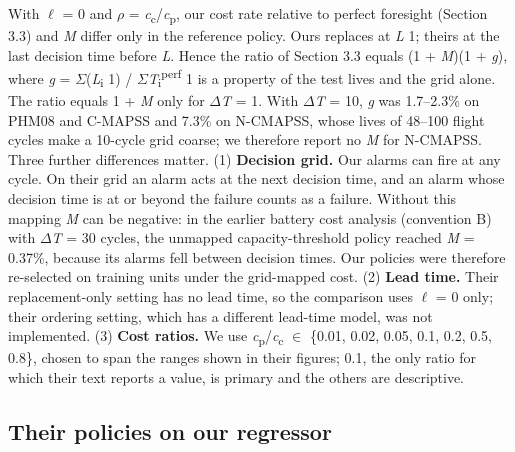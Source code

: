 \documentclass[a4paper,fleqn,doubleblind]{cas-dc}
\begin{document}
With $\ell$ = 0 and $\rho$ = \textit{c}\textsubscript{c}/\textit{c}\textsubscript{p}, our cost rate relative to perfect foresight (Section 3.3) and \textit{M} differ only in the reference policy. Ours replaces at \textit{L} \textminus{} 1; theirs at the last decision time before \textit{L}. Hence the ratio of Section 3.3 equals (1 + \textit{M})(1 + \textit{g}), where \textit{g} = $\Sigma$(\textit{L}\textsubscript{i} \textminus{} 1) / $\Sigma$\textit{T}\textsubscript{i}\textsuperscript{perf} \textminus{} 1 is a property of the test lives and the grid alone. The ratio equals 1 + \textit{M} only for $\Delta$\textit{T} = 1. With $\Delta$\textit{T} = 10, \textit{g} was 1.7--2.3\% on PHM08 and C-MAPSS and 7.3\% on N-CMAPSS, whose lives of 48--100 flight cycles make a 10-cycle grid coarse; we therefore report no \textit{M} for N-CMAPSS. Three further differences matter. (1) \textbf{Decision grid.} Our alarms can fire at any cycle. On their grid an alarm acts at the next decision time, and an alarm whose decision time is at or beyond the failure counts as a failure. Without this mapping \textit{M} can be negative: in the earlier battery cost analysis (convention B) with $\Delta$\textit{T} = 30 cycles, the unmapped capacity-threshold policy reached \textit{M} = \textminus{}0.37\%, because its alarms fell between decision times. Our policies were therefore re-selected on training units under the grid-mapped cost. (2) \textbf{Lead time.} Their replacement-only setting has no lead time, so the comparison uses $\ell$ = 0 only; their ordering setting, which has a different lead-time model, was not implemented. (3) \textbf{Cost ratios.} We use \textit{c}\textsubscript{p}/\textit{c}\textsubscript{c} $\in$ \{0.01, 0.02, 0.05, 0.1, 0.2, 0.5, 0.8\}, chosen to span the ranges shown in their figures; 0.1, the only ratio for which their text reports a value, is primary and the others are descriptive.

\subsection{Their policies on our regressor}
\end{document}
